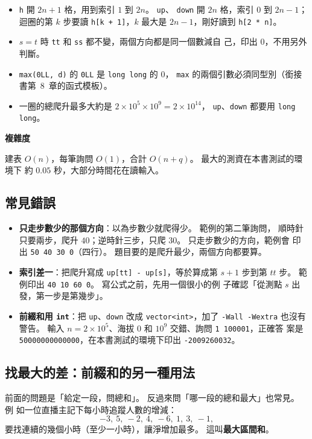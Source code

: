 \begin{itemize}
\item \texttt{h} 開 $2n + 1$ 格，用到索引 $1$ 到 $2n$。 \texttt{up}、
\texttt{down} 開 $2n$ 格，索引 $0$ 到 $2n - 1$；迴圈的第 $k$ 步要讀
\texttt{h[k + 1]}，$k$ 最大是 $2n - 1$，剛好讀到 \texttt{h[2 * n]}。
\item $s = t$ 時 \texttt{tt} 和 \texttt{ss} 都不變，兩個方向都是同一個數減自
己，印出 $0$，不用另外判斷。
\item \texttt{max(0LL, d)} 的 \texttt{0LL} 是 \texttt{long long} 的 $0$，
\texttt{max} 的兩個引數必須同型別（銜接書第~8~章的函式模板）。
\item 一圈的總爬升最多大約是 $2 \times 10^5 \times 10^9 = 2 \times 10^{14}$，
\texttt{up}、\texttt{down} 都要用 \texttt{long long}。
\end{itemize}

\textbf{複雜度}

建表 $O(n)$，每筆詢問 $O(1)$，合計 $O(n + q)$。 最大的測資在本書測試的環境下
約 $0.05$ 秒，大部分時間花在讀輸入。

\subsection{常見錯誤}

\begin{itemize}
\item \textbf{只走步數少的那個方向}：以為步數少就爬得少。 範例的第二筆詢問，
順時針只要兩步，爬升 $40$；逆時針三步，只爬 $30$。 只走步數少的方向，範例會
印出 \texttt{50 40 30 0}（四行）。 題目要的是爬升最少，兩個方向都要算。
\item \textbf{索引差一}：把爬升寫成 \texttt{up[tt] - up[s]}，等於算成第 $s + 1$
步到第 $tt$ 步。 範例印出 \texttt{40 10 60 0}。 寫公式之前，先用一個很小的例
子確認「從測點 $s$ 出發，第一步是第幾步」。
\item \textbf{前綴和用 \texttt{int}}：把 \texttt{up}、\texttt{down} 改成
\texttt{vector<int>}，加了 \texttt{-Wall -Wextra} 也沒有警告。 輸入
$n = 2 \times 10^5$、海拔 $0$ 和 $10^9$ 交錯、詢問 \texttt{1 100001}，正確答
案是 \texttt{50000000000000}，在本書測試的環境下印出 \texttt{-2009260032}。
\end{itemize}

\subsection{找最大的差：前綴和的另一種用法}
\label{sec:ps-maxsum}

前面的問題是「給定一段，問總和」。 反過來問「哪一段的總和最大」也常見。 例
如一位直播主記下每小時追蹤人數的增減：
\[
-3,\ 5,\ -2,\ 4,\ -6,\ 1,\ 3,\ -1 ,
\]
要找連續的幾個小時（至少一小時），讓淨增加最多。 這叫\textbf{最大區間和}。

